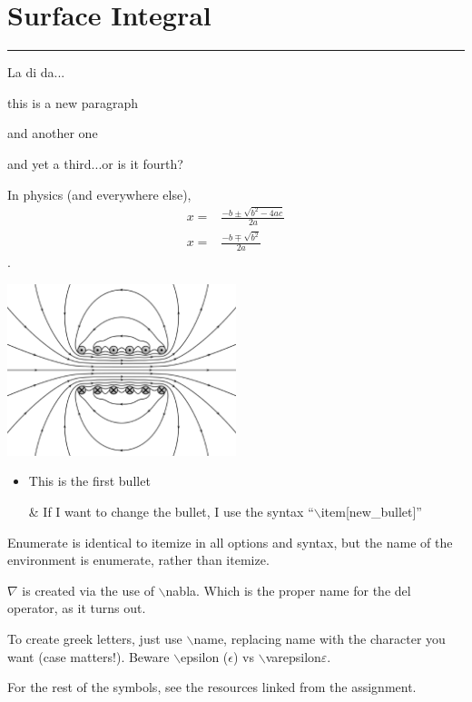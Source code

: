 \documentclass[letterpaper,10pt,titlepage,fleqn]{article}
\begin{document}

\section*{Surface Integral}
\hrule

La di da...

this is a new paragraph

and another one

and yet a third...or is it fourth?

In physics (and everywhere else), 
\begin{eqnarray}
  x =& \frac{-b \pm \sqrt{b^2 - 4ac}}{2a}\\
  x =& \frac{-b \mp \sqrt{b^2}}{2a}
\end{eqnarray}.

\centerline{\includegraphics[width=0.5\textwidth]{maxwell.eps}}

\begin{itemize}
\item This is the first bullet
\item[\&] If I want to change the bullet, I use the syntax 
	``$\backslash$item[new\_bullet]''
\end{itemize}

Enumerate is identical to itemize in all options and syntax, but the name of 
the environment is enumerate, rather than itemize.

$\nabla$ is created via the use of $\backslash$nabla. Which is the proper 
name for the del operator, as it turns out.

To create greek letters, just use $\backslash$name, replacing name with the 
character you want (case matters!). Beware $\backslash$epsilon ($\epsilon$) vs 
$\backslash$varepsilon$\varepsilon$.

For the rest of the symbols, see the resources linked from the assignment.
\end{document}
